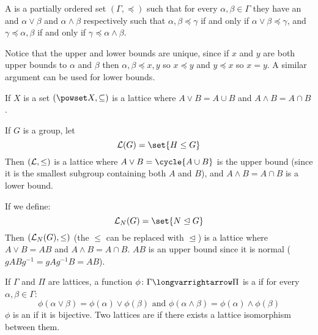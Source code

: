 \documentclass[10pt]{article}
\let\normalsub=\trianglelefteq
\begin{document}
\let\porder=\preccurlyeq

\begin{defn*}

    A  is a partially ordered set $(\Gamma,\porder)$ such that for every $\alpha,\beta\in\Gamma$ they have an  and  $\alpha\vee\beta$ and
    $\alpha\wedge\beta$ respectively such that $\alpha,\beta\porder\gamma$ if and only if $\alpha\vee\beta\porder\gamma$, and $\gamma\porder\alpha,\beta$ if and only if $\gamma\porder\alpha\wedge\beta$.

\end{defn*}

Notice that the upper and lower bounds are unique, since if $x$ and $y$ are both upper bounds to $\alpha$ and $\beta$ then $\alpha,\beta\porder x,y$ so $x\porder y$ and $y\porder x$ so $x=y$.
A similar argument can be used for lower bounds.

\begin{exam}

    If $X$ is a set $(\powset X,\subseteq)$ is a lattice where $A\vee B=A\cup B$ and $A\wedge B=A\cap B$.

\end{exam}

\begin{exam}

    If $G$ is a group, let
    \[ {\cal L}(G) = \set{H\leq G} \]
    Then $({\cal L}, \leq)$ is a lattice where $A\vee B=\cycle{A\cup B}$ is the upper bound (since it is the smallest subgroup containing both $A$ and $B$), and $A\wedge B=A\cap B$ is a lower bound.

    If we define:
    \[ {\cal L}_N(G) = \set{N\normalsub G} \]
    Then $({\cal L}_N(G), \leq)$ (the $\leq$ can be replaced with $\normalsub$) is a lattice where $A\vee B=AB$ and $A\wedge B=A\cap B$.
    $AB$ is an upper bound since it is normal ($gABg^{-1}=gAg^{-1}B=AB$).

\end{exam}

\begin{defn*}

    If $\Gamma$ and $\Pi$ are lattices, a function $\phi\colon\Gamma\longvarrightarrow\Pi$ is a  if for every $\alpha,\beta\in\Gamma$:
    \[ \phi(\alpha\vee\beta)=\phi(\alpha)\vee\phi(\beta) \text{ and } \phi(\alpha\wedge\beta) = \phi(\alpha)\wedge\phi(\beta) \]
    $\phi$ is an  if it is bijective.
    Two lattices are  if there exists a lattice isomorphism between them.

\end{defn*}
\end{document}
